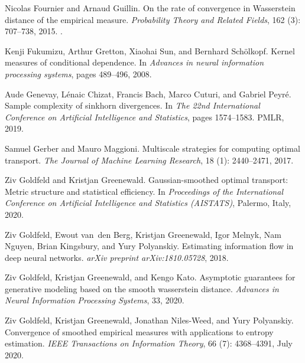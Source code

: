 \documentclass{article}
\theoremstyle{definition}
\begin{document}
\begin{thebibliography}{53}
Nicolas Fournier and Arnaud Guillin.
\newblock On the rate of convergence in {W}asserstein distance of the empirical
  measure.
\newblock \emph{Probability Theory and Related Fields}, 162
  (3): 707--738, 2015.
\newblock {}.

Kenji Fukumizu, Arthur Gretton, Xiaohai Sun, and Bernhard Sch{\"o}lkopf.
\newblock Kernel measures of conditional dependence.
\newblock In \emph{Advances in neural information processing systems}, pages
  489--496, 2008.

Aude Genevay, L{\'e}naic Chizat, Francis Bach, Marco Cuturi, and Gabriel
  Peyr{\'e}.
\newblock Sample complexity of sinkhorn divergences.
\newblock In \emph{The 22nd International Conference on Artificial Intelligence
  and Statistics}, pages 1574--1583. PMLR, 2019.

Samuel Gerber and Mauro Maggioni.
\newblock Multiscale strategies for computing optimal transport.
\newblock \emph{The Journal of Machine Learning Research}, 18
  (1): 2440--2471, 2017.

Ziv Goldfeld and Kristjan Greenewald.
\newblock Gaussian-smoothed optimal transport: {M}etric structure and
  statistical efficiency.
\newblock In \emph{Proceedings of the International Conference on Artificial
  Intelligence and Statistics (AISTATS)}, Palermo, Italy, 2020.

Ziv Goldfeld, Ewout van~den Berg, Kristjan Greenewald, Igor Melnyk, Nam Nguyen,
  Brian Kingsbury, and Yury Polyanskiy.
\newblock Estimating information flow in deep neural networks.
\newblock \emph{arXiv preprint arXiv:1810.05728}, 2018.

Ziv Goldfeld, Kristjan Greenewald, and Kengo Kato.
\newblock Asymptotic guarantees for generative modeling based on the smooth
  wasserstein distance.
\newblock \emph{Advances in Neural Information Processing Systems}, 33,
  2020{}.

Ziv Goldfeld, Kristjan Greenewald, Jonathan Niles-Weed, and Yury Polyanskiy.
\newblock Convergence of smoothed empirical measures with applications to
  entropy estimation.
\newblock \emph{IEEE Transactions on Information Theory}, 66
  (7): 4368--4391, July 2020{}.


\end{thebibliography}
\end{document}

